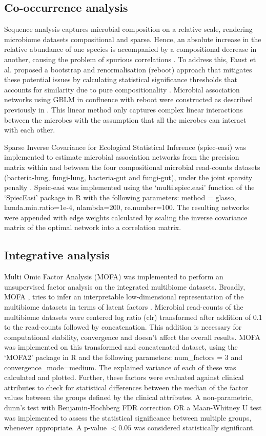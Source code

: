\subsection{Co-occurrence analysis}
Sequence analysis captures microbial composition on a relative scale, rendering microbiome datasets compositional and sparse. Hence, an absolute increase in the relative abundance of one species is accompanied by a compositional decrease in another, causing the problem of spurious correlations \cite{Aitchison1982}. To address this, Faust et al. proposed a bootstrap and renormalisation (reboot) approach that mitigates these potential issues by calculating statistical significance thresholds that accounts for similarity due to pure compositionality \cite{Faust2012}. Microbial association networks using GBLM in confluence with reboot were constructed as described previously in \cite{Narayana2019}. This linear method only captures complex linear interactions between the microbes with the assumption that all the microbes can interact with each other. 
 
Sparse Inverse Covariance for Ecological Statistical Inference (spiec-easi) was implemented to estimate microbial association networks from the precision matrix within and between the four compositional microbial read-counts datasets (bacteria-lung, fungi-lung, bacteria-gut and fungi-gut), under the joint sparsity penalty \cite{Kurtz2015}. Speic-easi was implemented using the `multi.spiec.easi' function of the `SpiecEasi' package in R with the following parameters: method = glasso, lamda.min.ratio=1e-4, nlambda=200, re.number=100. The resulting networks were appended with edge weights calculated by scaling the inverse covariance matrix of the optimal network into a correlation matrix.


\subsection{Integrative analysis}
Multi Omic Factor Analysis (MOFA) was implemented to perform an unsupervised factor analysis on the integrated multibiome datasets. Broadly, MOFA , tries to infer an interpretable low-dimensional representation of the multibiome datasets in terms of latent factors \cite{Argelaguet2020}. Microbial read-counts of the multibiome datasets were centered log ratio (clr) transformed after addition of 0.1 to the read-counts followed by concatenation. This addition is necessary for computational stability, convergence and doesn't affect the overall results. MOFA was implemented on this transformed and concatenated dataset, using the `MOFA2' package in R and the following parameters: num\_factors = 3 and convergence\_mode=medium. The explained variance of each of these was calculated and plotted. Further, these factors were evaluated against clinical attributes to check for statistical differences between the median of the factor values between the groups defined by the clinical attributes. A non-parametric, dunn's test with Benjamin-Hochberg FDR correction OR a Maan-Whitney U test was implemented to assess the statistical significance between multiple groups, whenever appropriate. A p-value $< 0.05$ was considered statistically significant.

